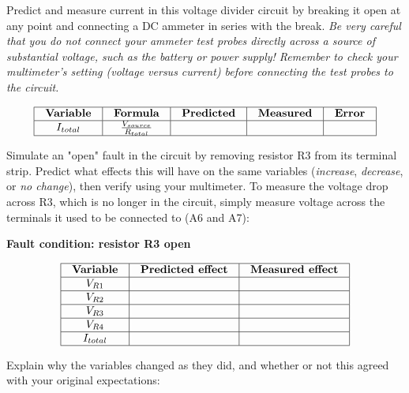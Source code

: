 Predict and measure current in this voltage divider circuit by breaking it open at any point and connecting a DC ammeter in series with the break.  {\it Be very careful that you do not connect your ammeter test probes directly across a source of substantial voltage, such as the battery or power supply!  Remember to check your multimeter's setting (voltage versus current) before connecting the test probes to the circuit.}


$$\vbox{\offinterlineskip
\halign{\strut
\vrule \quad\hfil # \ \hfil & 
\vrule \quad\hfil # \ \hfil & 
\vrule \quad\hfil # \ \hfil & 
\vrule \quad\hfil # \ \hfil & 
\vrule \quad\hfil # \ \hfil \vrule \cr 
\noalign{\hrule}
%
{\bf Variable} & {\bf Formula} & {\bf Predicted} & {\bf Measured} & {\bf Error} \cr
\noalign{\hrule}
%
$I_{total}$  &  $V_{source} \over R_{total}$  &   &   &   \cr
\noalign{\hrule}
} %
}$$ %

Simulate an "open" fault in the circuit by removing resistor R3 from its terminal strip.  Predict what effects this will have on the same variables ({\it increase}, {\it decrease}, or {\it no change}), then verify using your multimeter.  To measure the voltage drop across R3, which is no longer in the circuit, simply measure voltage across the terminals it used to be connected to (A6 and A7):

\vskip 10pt

\goodbreak


\centerline{\bf Fault condition: resistor R3 open}

$$\vbox{\offinterlineskip
\halign{\strut
\vrule \quad\hfil # \ \hfil & 
\vrule \quad\hfil # \ \hfil & 
\vrule \quad\hfil # \ \hfil \vrule \cr 
\noalign{\hrule}
%
{\bf Variable} & {\bf Predicted effect} & {\bf Measured effect} \cr
\noalign{\hrule}
%
$V_{R1}$   &   &   \cr
\noalign{\hrule}
%
$V_{R2}$   &   &   \cr
\noalign{\hrule}
%
$V_{R3}$   &   &   \cr
\noalign{\hrule}
%
$V_{R4}$   &   &   \cr
\noalign{\hrule}
%
$I_{total}$   &   &   \cr
\noalign{\hrule}
} %
}$$ %

Explain why the variables changed as they did, and whether or not this agreed with your original expectations:

